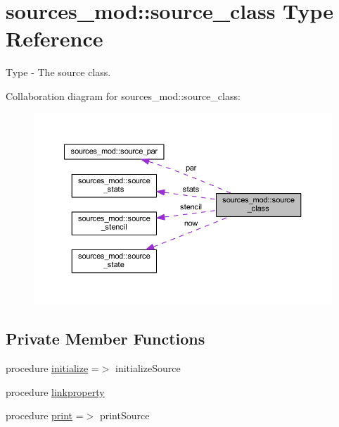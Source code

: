 \hypertarget{structsources__mod_1_1source__class}{}\section{sources\+\_\+mod\+:\+:source\+\_\+class Type Reference}
\label{structsources__mod_1_1source__class}


Type -\/ The source class.  




Collaboration diagram for sources\+\_\+mod\+:\+:source\+\_\+class\+:
\nopagebreak
\begin{figure}[H]
\begin{center}
\leavevmode
\includegraphics[width=350pt]{structsources__mod_1_1source__class__coll__graph}
\end{center}
\end{figure}
\subsection*{Private Member Functions}
\begin{DoxyCompactItemize}
\item 
procedure \hyperlink{structsources__mod_1_1source__class_a996650639d039c09d2b77a36473e977e}{initialize} =$>$ initialize\+Source
\item 
procedure \hyperlink{structsources__mod_1_1source__class_a30cdd922a476d166a673c76c451bc381}{linkproperty}
\item 
procedure \hyperlink{structsources__mod_1_1source__class_af632299e6c5e29a7f2008417aa68d529}{print} =$>$ print\+Source
\end{DoxyCompactItemize}
